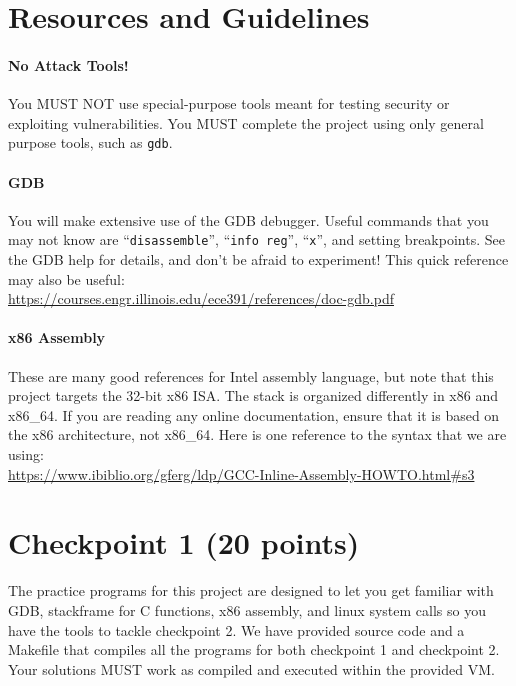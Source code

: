 \documentclass[letterpaper,12pt]{report}
\begin{document}
{\begin{enumerate}
\end{enumerate}

\pagebreak

\vspace{-16pt}

\section*{Resources and Guidelines}

\vspace{-3pt}
\paragraph{No Attack Tools!}
You MUST NOT use special-purpose tools meant for testing security or exploiting vulnerabilities.  You MUST complete the project using only general purpose tools, such as \texttt{gdb}.

\vspace{-6pt}
\paragraph{GDB}
You will make extensive use of the GDB debugger. Useful commands that you may not know are ``\texttt{disassemble}'', ``\texttt{info reg}'', ``\texttt{x}'', and setting breakpoints. See the GDB help for details, and don't be afraid to experiment!  This quick reference may also be useful: \\ \url{https://courses.engr.illinois.edu/ece391/references/doc-gdb.pdf}

\vspace{-6pt}
\paragraph{x86 Assembly}
These are many good references for Intel assembly language, but note that this project targets the 32-bit x86 ISA.  The stack is organized differently in x86 and x86\_64. If you are reading any online documentation, ensure that it is based on the x86 architecture, not  x86\_64. Here is one reference to the syntax that we are using: \\ \url{https://www.ibiblio.org/gferg/ldp/GCC-Inline-Assembly-HOWTO.html#s3}

\newpage

\setcounter{chapter}{1}

\section{Checkpoint 1 (20 points)}
\label{sec:checkpoint_1}
The practice programs for this project are designed to let you get familiar with GDB, stackframe for C functions, x86 assembly, and linux system calls so you have the tools to tackle checkpoint 2. We have provided source code and a Makefile that compiles all the programs for both checkpoint 1 and checkpoint 2.  Your solutions MUST work as compiled and executed within the provided VM.

}
\end{document}
